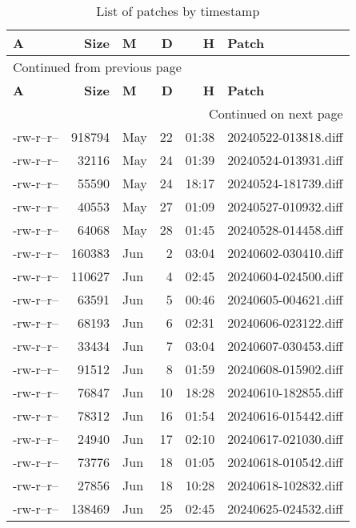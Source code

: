 \documentclass[a4paper]{article}
\begin{document}
\sffamily
\begin{longtable}{lrlrrl}
\caption{List of patches by timestamp}
\\[0pt]
\textbf{A} & \textbf{Size} & \textbf{M} & \textbf{D} & \textbf{H} & \textbf{Patch}\\[0pt]
\hline
\endfirsthead
\multicolumn{6}{l}{Continued from previous page} \\[0pt]
\hline

\textbf{A} & \textbf{Size} & \textbf{M} & \textbf{D} & \textbf{H} & \textbf{Patch} \\[0pt]

\hline
\endhead
\hline\multicolumn{6}{r}{Continued on next page} \\
\endfoot
\endlastfoot
\hline
-rw-r--r-- & 918794 & May & 22 & 01:38 & 20240522-013818.diff\\[0pt]
-rw-r--r-- & 32116 & May & 24 & 01:39 & 20240524-013931.diff\\[0pt]
-rw-r--r-- & 55590 & May & 24 & 18:17 & 20240524-181739.diff\\[0pt]
-rw-r--r-- & 40553 & May & 27 & 01:09 & 20240527-010932.diff\\[0pt]
-rw-r--r-- & 64068 & May & 28 & 01:45 & 20240528-014458.diff\\[0pt]
-rw-r--r-- & 160383 & Jun & 2 & 03:04 & 20240602-030410.diff\\[0pt]
-rw-r--r-- & 110627 & Jun & 4 & 02:45 & 20240604-024500.diff\\[0pt]
-rw-r--r-- & 63591 & Jun & 5 & 00:46 & 20240605-004621.diff\\[0pt]
-rw-r--r-- & 68193 & Jun & 6 & 02:31 & 20240606-023122.diff\\[0pt]
-rw-r--r-- & 33434 & Jun & 7 & 03:04 & 20240607-030453.diff\\[0pt]
-rw-r--r-- & 91512 & Jun & 8 & 01:59 & 20240608-015902.diff\\[0pt]
-rw-r--r-- & 76847 & Jun & 10 & 18:28 & 20240610-182855.diff\\[0pt]
-rw-r--r-- & 78312 & Jun & 16 & 01:54 & 20240616-015442.diff\\[0pt]
-rw-r--r-- & 24940 & Jun & 17 & 02:10 & 20240617-021030.diff\\[0pt]
-rw-r--r-- & 73776 & Jun & 18 & 01:05 & 20240618-010542.diff\\[0pt]
-rw-r--r-- & 27856 & Jun & 18 & 10:28 & 20240618-102832.diff\\[0pt]
-rw-r--r-- & 138469 & Jun & 25 & 02:45 & 20240625-024532.diff\\[0pt]

\end{longtable}
\end{document}
